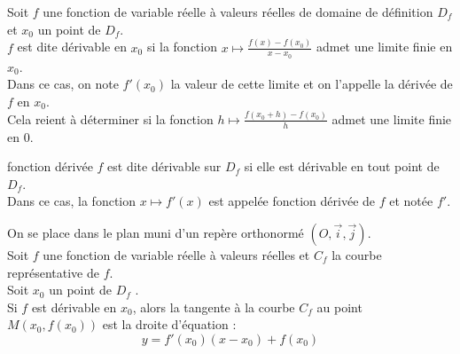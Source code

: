 \begin{defi}
	Soit \(f\) une fonction de variable réelle à valeurs réelles de domaine de définition \(D_f\) et \(x_0\) un point de \(D_f\). \\
	\(f\) est dite dérivable en \(x_0\) si la fonction \(x\mapsto \frac{f(x)-f(x_0)}{x-x_0}\) admet une limite finie en \(x_0\). \\
	Dans ce cas, on note \(f'(x_0)\) la valeur de cette limite et on l'appelle la dérivée de \(f\) en \(x_0\). \\
	Cela reient à déterminer si la fonction \(h\mapsto \frac{f(x_0+h)-f(x_0)}{h}\) admet une limite finie en \(0\).\\
\end{defi}

\begin{defi}{fonction dérivée}
	\(f\) est dite dérivable sur \(D_f\) si elle est dérivable en tout point de \(D_f\). \\
	Dans ce cas, la fonction \(x\mapsto f'(x)\) est appelée fonction dérivée de \(f\) et notée \(f'\). \\
\end{defi}

\begin{defprop}
	On se place dans le plan muni d’un repère orthonormé \((O, \vec{i}, \vec{j})\). \\
	Soit \(f\) une fonction de variable réelle à valeurs réelles et \(C_f\) la courbe représentative de \(f\). \\
	Soit \(x_0\) un point de \(D_f\) .\\
	Si \(f\) est dérivable en \(x_0\), alors la tangente à la courbe \(C_f\) au point \(M(x_0, f(x_0))\) est la droite d’équation :
	\[y = f'(x_0)(x-x_0) + f(x_0)\]
\end{defprop}

